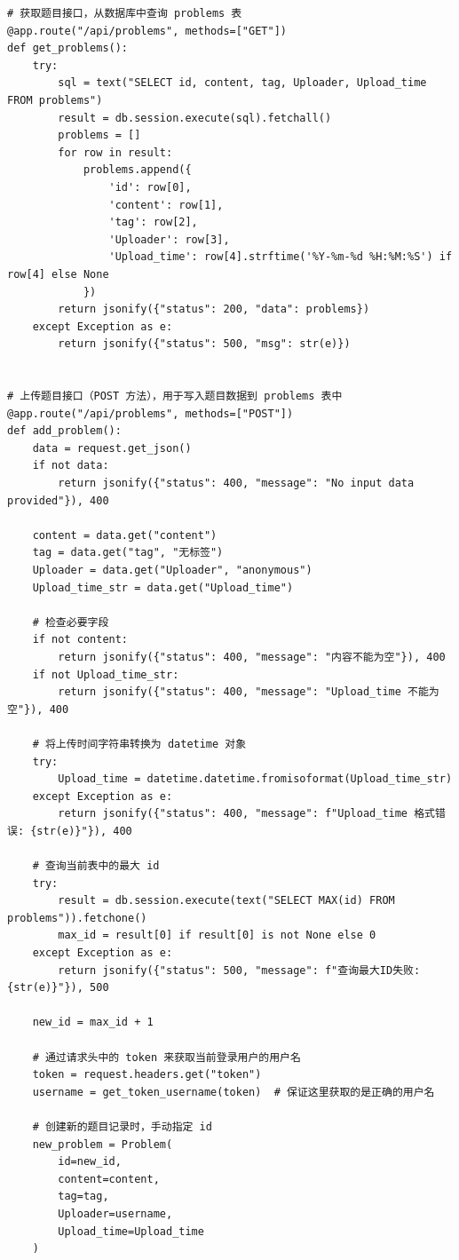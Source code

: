 \documentclass[a4paper,AutoFakeBold={2.7}]{ctexart} %
\begin{document}
\begin{lstlisting}
# 获取题目接口，从数据库中查询 problems 表
@app.route("/api/problems", methods=["GET"])
def get_problems():
    try:
        sql = text("SELECT id, content, tag, Uploader, Upload_time FROM problems")
        result = db.session.execute(sql).fetchall()
        problems = []
        for row in result:
            problems.append({
                'id': row[0],
                'content': row[1],
                'tag': row[2],
                'Uploader': row[3],
                'Upload_time': row[4].strftime('%Y-%m-%d %H:%M:%S') if row[4] else None
            })
        return jsonify({"status": 200, "data": problems})
    except Exception as e:
        return jsonify({"status": 500, "msg": str(e)})


# 上传题目接口（POST 方法），用于写入题目数据到 problems 表中
@app.route("/api/problems", methods=["POST"])
def add_problem():
    data = request.get_json()
    if not data:
        return jsonify({"status": 400, "message": "No input data provided"}), 400

    content = data.get("content")
    tag = data.get("tag", "无标签")
    Uploader = data.get("Uploader", "anonymous")
    Upload_time_str = data.get("Upload_time")

    # 检查必要字段
    if not content:
        return jsonify({"status": 400, "message": "内容不能为空"}), 400
    if not Upload_time_str:
        return jsonify({"status": 400, "message": "Upload_time 不能为空"}), 400

    # 将上传时间字符串转换为 datetime 对象
    try:
        Upload_time = datetime.datetime.fromisoformat(Upload_time_str)
    except Exception as e:
        return jsonify({"status": 400, "message": f"Upload_time 格式错误: {str(e)}"}), 400

    # 查询当前表中的最大 id
    try:
        result = db.session.execute(text("SELECT MAX(id) FROM problems")).fetchone()
        max_id = result[0] if result[0] is not None else 0
    except Exception as e:
        return jsonify({"status": 500, "message": f"查询最大ID失败: {str(e)}"}), 500

    new_id = max_id + 1

    # 通过请求头中的 token 来获取当前登录用户的用户名
    token = request.headers.get("token")
    username = get_token_username(token)  # 保证这里获取的是正确的用户名

    # 创建新的题目记录时，手动指定 id
    new_problem = Problem(
        id=new_id,
        content=content,
        tag=tag,
        Uploader=username,
        Upload_time=Upload_time
    )


\end{lstlisting}
\end{document}
